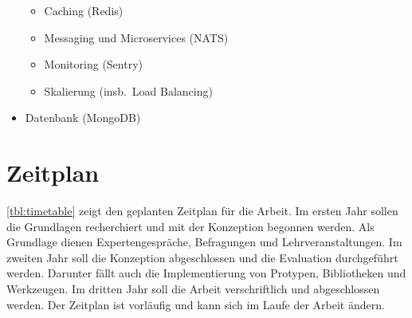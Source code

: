 \begin{itemize}
\begin{itemize}
        \item Caching (Redis)
        \item Messaging und Microservices (NATS)
        \item Monitoring (Sentry)
        \item Skalierung (insb.\ Load Balancing)
    \end{itemize}
    \item Datenbank (MongoDB)
\end{itemize}

\section{Zeitplan}\label{sec:zeitplan}

\autoref{tbl:timetable} zeigt den geplanten Zeitplan für die Arbeit.
Im ersten Jahr sollen die Grundlagen recherchiert und mit der Konzeption begonnen werden.
Als Grundlage dienen Expertengespräche, Befragungen und Lehrveranstaltungen.
Im zweiten Jahr soll die Konzeption abgeschlossen und die Evaluation durchgeführt werden.
Darunter fällt auch die Implementierung von Protypen, Bibliotheken und Werkzeugen.
Im dritten Jahr soll die Arbeit verschriftlich und abgeschlossen werden.
Der Zeitplan ist vorläufig und kann sich im Laufe der Arbeit ändern.

